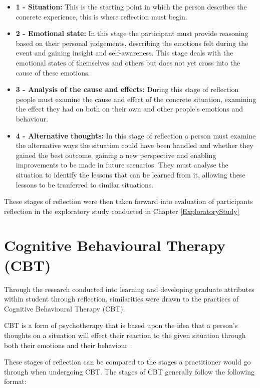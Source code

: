 \documentclass{l4proj}
\begin{document}
\begin{itemize}
    \item \textbf{1 - Situation:} This is the starting point in which the person describes the concrete experience, this is where reflection must begin.
    \item \textbf{2 - Emotional state:} In this stage the participant must provide reasoning based on their personal judgements, describing the emotions felt 
    during the event and gaining insight and self-awareness. This stage deals with the emotional states of themselves and others but does not yet cross 
    into the cause of these emotions.
    \item \textbf{3 - Analysis of the cause and effects:} During this stage of reflection people must examine the cause and effect of the concrete situation,
    examining the effect they had on both on their own and other people's emotions and behaviour.
    \item \textbf{4 - Alternative thoughts:} In this stage of reflection a person must examine the alternative ways the situation could have been handled and
    whether they gained the best outcome, gaining a new perspective and enabling improvements to be made in future scenarios. They must analyse the situation 
    to identify the lessons that can be learned from it, allowing these lessons to be tranferred to similar situations.
\end{itemize}
These stages of reflection were then taken forward into evaluation of participants reflection in the exploratory study conducted in Chapter \ref{ExploratoryStudy}



\section{Cognitive Behavioural Therapy (CBT)}

Through the research conducted into learning and developing graduate attributes within student through reflection, similarities were drawn to the practices of 
Cognitive Behavioural Therapy (CBT). 

CBT is a form of psychotherapy that is based upon the idea that a person's thoughts on a situation will effect their reaction to the given situation 
through both their emotions and their behaviour \citep{whatisCBT_therapistAid}. 

These stages of reflection can be compared to the stages a practitioner would go through when undergoing CBT.
The stages of CBT generally follow the following format:
\end{document}
